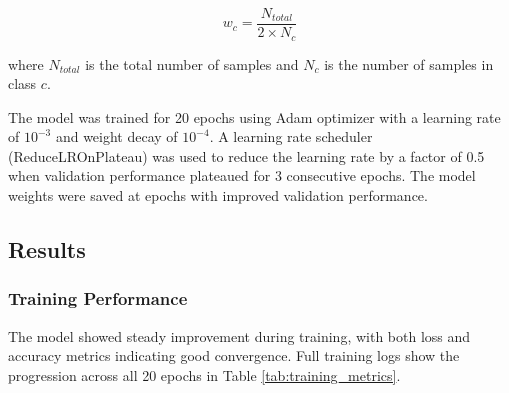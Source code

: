 \documentclass[11pt,a4paper]{article}
\begin{document}
\begin{equation}
    w_c = \frac{N_{total}}{2 \times N_c}
\end{equation}

where $N_{total}$ is the total number of samples and $N_c$ is the number of samples in class $c$.

The model was trained for 20 epochs using Adam optimizer with a learning rate of $10^{-3}$ and weight decay of $10^{-4}$. A learning rate scheduler (ReduceLROnPlateau) was used to reduce the learning rate by a factor of 0.5 when validation performance plateaued for 3 consecutive epochs. The model weights were saved at epochs with improved validation performance.

\subsection{Results}

\subsubsection{Training Performance}
The model showed steady improvement during training, with both loss and accuracy metrics indicating good convergence. Full training logs show the progression across all 20 epochs in Table \ref{tab:training_metrics}.
\end{document}
